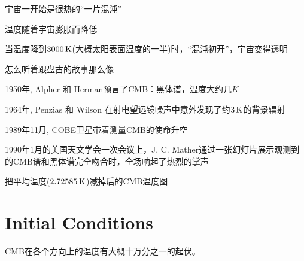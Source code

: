\documentclass[CJK]{beamer}
\begin{document}
\begin{frame}
  \bch
  \bitem
\item{宇宙一开始是很热的“一片混沌”
}
\item{温度随着宇宙膨胀而降低}
\item{当温度降到$3000\,\mathrm{K}$(大概太阳表面温度的一半)时，“混沌初开”，宇宙变得透明}
  \eitem

  \wulian 怎么听着跟盘古的故事那么像
  
  \ech
\end{frame}

\begin{frame}
  \bch
  \ech
\end{frame}


\begin{frame}
  \bch
  \bitem
\item{1950年, Alpher 和 Herman预言了CMB：黑体谱，温度大约几$K$}
\item{1964年, Penzias 和 Wilson 在射电望远镜噪声中意外发现了约$3\,\mathrm{K}$的背景辐射}
\item{1989年11月, COBE卫星带着测量CMB的使命升空}
\item{   \emini
  1990年1月的美国天文学会一次会议上，J. C. Mather通过一张幻灯片展示观测到的CMB谱和黑体谱完全吻合时，全场响起了热烈的掌声\emini
}  
  \eitem

  \ech
\end{frame}

\begin{frame}
  \bch
  \ech
\end{frame}


\begin{frame}
  \bch
  \bcenter
  
  把平均温度($2.72585\,\mathrm{K}$)减掉后的CMB温度图
  \ecenter
  \ech
\end{frame}

\section{Initial Conditions}
\begin{frame}
  \bch
  CMB在各个方向上的温度有大概十万分之一的起伏。
  \ech
\end{frame}
\end{document}
